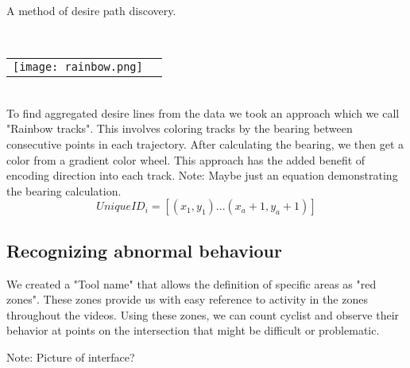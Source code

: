 A method of desire path discovery.

\ \\ 
\noindent
\begin{tabular}{@{}cc}
\texttt{[image: rainbow.png]} 
\end{tabular}
\label{Rainbow}
\ \\

To find aggregated desire lines from the data we took an approach which we call "Rainbow tracks". This involves coloring tracks by the bearing between consecutive points in each trajectory. After calculating the bearing, we then get a color from a gradient color wheel. This approach has the added benefit of encoding direction into 
each track.
Note: Maybe just an equation demonstrating the bearing calculation.
\ \\ 

\begin{equation}
  UniqueID_i = [(x_1, y_1)...(x_a+1, y_a+1)]\label{eq:3}
\end{equation}

\subsection{Recognizing abnormal behaviour}

\color{red}
We created a "Tool name" that allows the definition of specific areas as "red zones". These zones provide us with easy reference to activity in the zones throughout the videos.
Using these zones, we can count cyclist and observe their behavior at points on the intersection that might be difficult or
problematic.

Note: Picture of interface?

